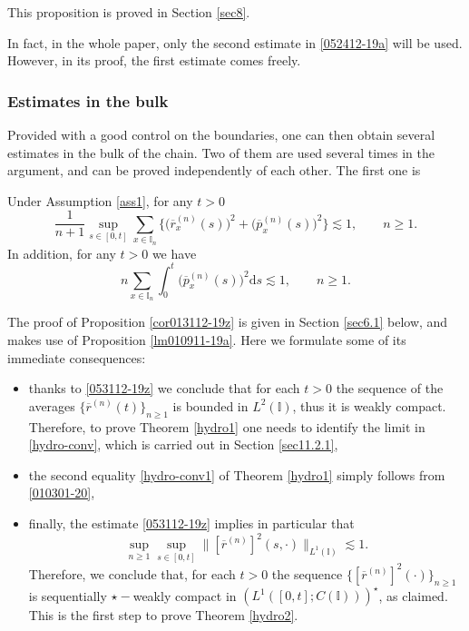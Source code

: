 \documentclass[EJP]{ejpecp} %
\newcommand\T{{\mathbb I}}
\renewcommand{\ge}{\geqslant}
\newcommand{\dd  }{\mathrm{d}}
\renewcommand{\bar}{\overline}
\numberwithin{equation}{section}
\begin{document}
This proposition is proved in Section  
\ref{sec8}.



\begin{remark}
In fact, in the whole paper, only the second estimate in \eqref{052412-19a} will be used. However, in its proof, the first estimate comes freely.
\end{remark}

\subsubsection{Estimates in the bulk} 
Provided with a good control on the boundaries, one can then obtain several estimates in the bulk of the chain. Two of them are used several times in the argument, and can be proved independently of each other. The first one is

\begin{proposition}
\label{cor013112-19z}
Under Assumption \ref{ass1}, for any $t>0$
\begin{equation}
\label{053112-19z}
\frac{1}{n+1}\sup_{s\in[0,t]}\sum_{x\in\T_n}\Big\{\big(\bar r_x^{(n)} (s)\big)^2+\big(\bar
p_x^{(n)}(s)\big)^2\Big\}\lesssim 1,\qquad n\ge1.
\end{equation}
In addition,
for any $t>0$ we have
\begin{equation}
\label{010301-20}
n\sum_{x\in\T_n}\int_0^t \big(\bar
p_x^{(n)}(s)\big)^2\dd s\lesssim 1,\qquad n\ge1.
\end{equation}
\end{proposition} 
The proof of Proposition \ref{cor013112-19z} {is given} in Section
\ref{sec6.1} below, and makes use of Proposition \ref{lm010911-19a}.  Here we formulate some of its immediate consequences: 
\begin{itemize}
\item thanks to \eqref{053112-19z} we conclude  
 that   for each $t>0$ the sequence of the averages $\{\bar
  r^{(n)}(t)\}_{n\ge1}$ is bounded in $L^2(\T)$, thus it is weakly
compact. Therefore, to prove Theorem \ref{hydro1} one needs to identify the limit in \eqref{hydro-conv}, which is carried out in Section
\ref{sec11.2.1},
\item the second equality \eqref{hydro-conv1} of Theorem \ref{hydro1} simply follows from  \eqref{010301-20},
\item finally, the estimate  \eqref{053112-19z}  implies in particular that
\begin{equation}
\label{010203y}
\sup_{n\ge1}\sup_{s\in[0,t]}\big\|[\bar
r^{(n)}]^2 (s,\cdot)\big\|_{L^1(\T)}\lesssim 1.
\end{equation}
Therefore, we conclude that, for each $t>0$ the sequence $\{[\bar r^{(n)}]^2 (\cdot)\}_{n\ge1}$ is sequentially $\star-$weakly
compact in $\left(L^1([0,t];C(\T))\right)^\star$, as claimed. This is the first step to prove Theorem \ref{hydro2}.
\end{itemize}
\end{document}
